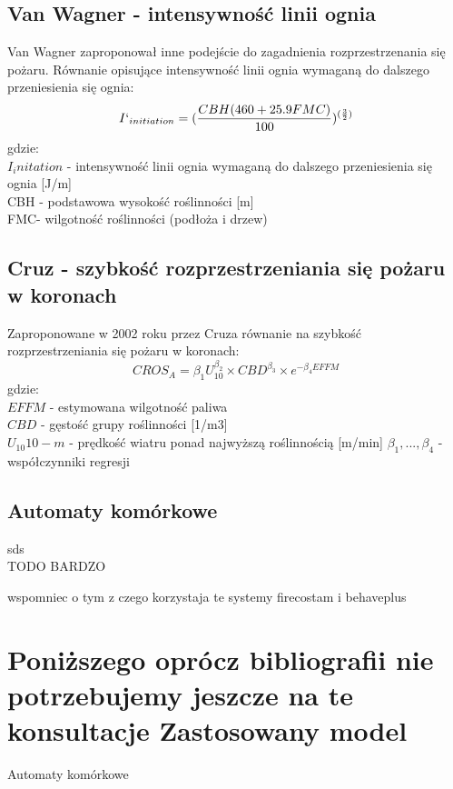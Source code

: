 \documentclass[a4paper, 11pt]{article}
\begin{document}
\subsection{Van Wagner - intensywność linii ognia}
\indent
Van Wagner zaproponował inne podejście do zagadnienia rozprzestrzenania się pożaru. Równanie opisujące intensywność linii ognia wymaganą do dalszego przeniesienia się ognia:
$$
I`_{initiation}=(\frac{CBH(460+25.9FMC)}{100})^{(\frac{3}{2})}
$$
gdzie:\\
$I_initation$ - intensywność linii ognia wymaganą do dalszego przeniesienia się ognia [J/m] \\
CBH - podstawowa wysokość roślinności [m]\\
FMC- wilgotność roślinności (podłoża i drzew)\\
\iffalse
\subsection{Cruz(1999)}
$$
g(x)=\beta_0+\beta_{1}U_10+\beta_{2}FSG+ \sum\limits_{a=1}^{k_j -1}\beta_{ju}D_{ju}+\beta_5EFFM
$$
EFFM- estimated fine ful moisture content(\% ovendry mass basis)\\
$U_10  10-m$ open wind speed
$\beta_1, ...,\beta_4$ -regression coefficients
\fi
\subsection{Cruz - szybkość rozprzestrzeniania się pożaru w koronach}
\indent
Zaproponowane w 2002 roku przez Cruza równanie na szybkość rozprzestrzeniania się pożaru w koronach: 
$$
CROS_A=\beta_1U^{\beta_2}_10 \times CBD^{\beta_3} \times e^{-\beta_4EFFM}
$$
gdzie: \\
$EFFM$ - estymowana wilgotność paliwa \\
$CBD$ - gęstość grupy roślinności [1/m3]\\
$U_10  10-m$ - prędkość wiatru ponad najwyższą roślinnością [m/min]
$\beta_1, ...,\beta_4$ -współczynniki regresji\\
\subsection{Automaty komórkowe}	
\indent
sds
\\TODO BARDZO

	wspomniec o tym z czego korzystaja te systemy firecostam i behaveplus
	
	
	
	\section{Poniższego oprócz bibliografii nie potrzebujemy jeszcze na te konsultacje  Zastosowany model}
	\indent
Automaty komórkowe
		
\end{document}
